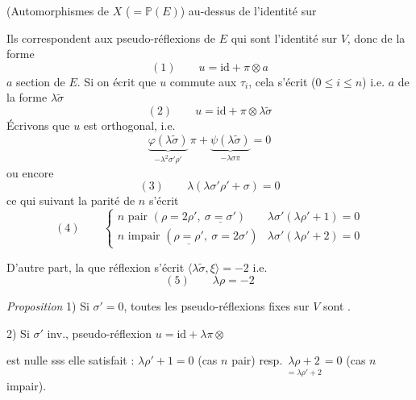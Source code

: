 \documentclass[11pt,a4paper]{article}
\begin{document}

(Automorphismes de $X$ ($= \mathbb{P}(E)$) au-dessus de l'identité sur \ill{}

Ils correspondent aux pseudo-réflexions de $E$ qui sont l'identité sur $V$, donc de la forme
\[
(1) \qquad u = \mathrm{id} + \pi \otimes a
\]
$a$ section de $E$. Si on écrit que $u$ commute aux $\tau_i$, cela s'écrit  ($0 \leq i \leq n$) i.e. $a$ de la forme $\lambda\tilde{\sigma}$
\[
(2) \qquad u = \mathrm{id} + \pi \otimes \lambda\tilde{\sigma}
\]
Écrivons que $u$ est orthogonal, i.e.
\[
\underbrace{\varphi(\lambda\tilde{\sigma})}_{-\lambda^{2}\sigma'\rho'}\,\pi + \underbrace{\psi(\lambda\tilde{\sigma})}_{-\lambda\sigma\pi} = 0
\]
ou encore
\[
(3) \qquad \lambda(\lambda\sigma'\rho' + \sigma) = 0
\]
ce qui suivant la parité de $n$ s'écrit
\[
(4) \qquad \begin{cases}
n \text{ pair } (\rho = 2\rho',\ \underline{\sigma = \sigma'}) & \lambda\sigma'(\lambda\rho' + 1) = 0\\
n \text{ impair } (\underline{\rho = \rho'},\ \sigma = 2\sigma') & \lambda\sigma'(\lambda\rho' + 2) = 0
\end{cases}
\]

D'autre part, la \struck{\ill{}}  que  réflexion s'écrit $\langle \lambda\tilde{\sigma}, \xi\rangle = -2$ i.e.
\[
(5) \qquad \lambda\rho = -2
\]

\struck{\ill{}}

\emph{Proposition} 1) Si $\sigma' = 0$, toutes les \struck{\ill{}}  pseudo-réflexions   fixes sur $V$ sont .

2) Si $\sigma'$ inv., \struck{\ill{}}  pseudo-réflexion $u = \mathrm{id} + \lambda\pi\otimes$\ill{}

est nulle sss elle satisfait : $\lambda\rho' + 1 = 0$ (cas $n$ pair) resp. $\underset{= \lambda\rho' + 2}{\lambda\rho + 2} = 0$ (cas $n$ impair).
\end{document}
